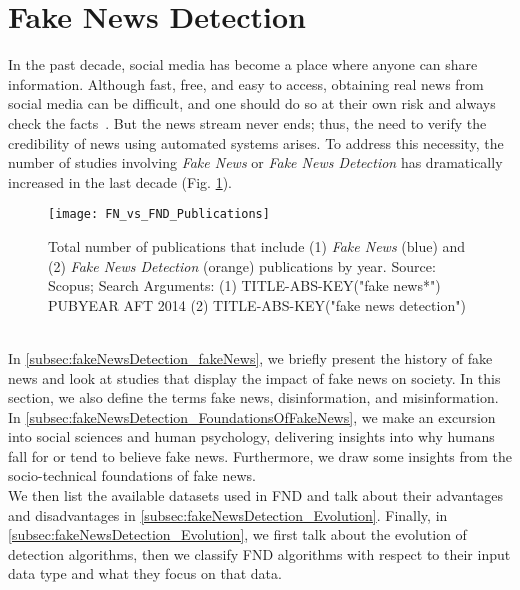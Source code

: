 \section{Fake News Detection}
\label{sec:fakeNewsDetection}
In the past decade, social media has become a place where anyone can share information. Although fast, free, and easy to access, obtaining
real news from social media can be difficult, and one should do so at their own risk and always check the
facts~\parencite{SocialMediaAndFakeNewsIn2016Election_Allcott,TheScienceOfFakeNews_Lazer}. But the news stream never ends; thus, the need to verify the credibility of news using automated systems arises. To address this necessity, the number of studies involving \emph{Fake News} or \emph{Fake News Detection} has dramatically increased in the last decade (Fig. \ref{fig:FN_vs_FND_Publications}).
\begin{figure}
    \centering
    \texttt{[image: FN\_vs\_FND\_Publications]}
    \caption[Fake News and Fake News Detection Publications by Year]{Total number of publications that include (1) \emph{Fake News} (blue) and (2) \emph{Fake News Detection} (orange) publications by year. Source: Scopus; Search Arguments: (1) TITLE-ABS-KEY("fake news*") PUBYEAR AFT 2014 (2) TITLE-ABS-KEY("fake news detection")}\label{fig:FN_vs_FND_Publications}
\end{figure}\\
In \ref{subsec:fakeNewsDetection_fakeNews}, we briefly present the history of fake news and look at studies that display the impact of fake news on society. In this section, we also define the terms fake news, disinformation, and misinformation. \\
In \ref{subsec:fakeNewsDetection_FoundationsOfFakeNews}, we make an excursion into social sciences and human psychology, delivering insights into why humans fall for or tend to believe fake news. Furthermore, we draw some insights from the socio-technical foundations of fake news.\\
We then list the available datasets used in FND and talk about their advantages and disadvantages in \ref{subsec:fakeNewsDetection_Evolution}. Finally, in \ref{subsec:fakeNewsDetection_Evolution}, we first talk about the evolution of detection algorithms, then we classify FND algorithms with respect to their input data type and what they focus on that data.\\
